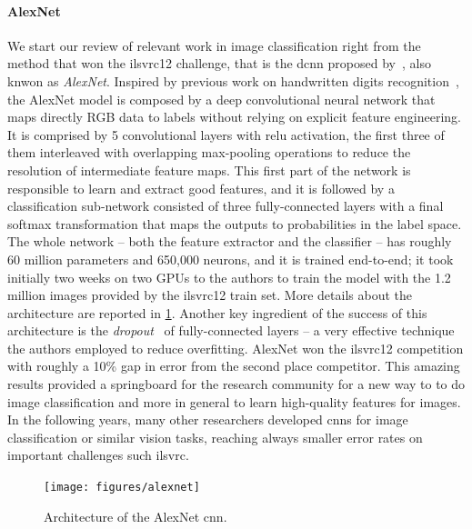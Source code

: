\paragraph{AlexNet}
We start our review of relevant work in image classification right from the method that won the \gls{ilsvrc}12 challenge, that is the \gls{dcnn} proposed by~\citet{krizhevsky2012imagenet}, also knwon as \emph{AlexNet}.
Inspired by previous work on handwritten digits recognition~\cite{lecun1989backpropagation}, the AlexNet model is composed by a deep convolutional neural network that maps directly RGB data to labels without relying on explicit feature engineering.
It is comprised by 5 convolutional layers with \gls{relu} activation, the first three of them interleaved with overlapping max-pooling operations to reduce the resolution of intermediate feature maps.
This first part of the network is responsible to learn and extract good features, and it is followed by a classification sub-network consisted of three fully-connected layers with a final softmax transformation that maps the outputs to probabilities in the label space.
The whole network -- both the feature extractor and the classifier -- has roughly 60 million parameters and 650,000 neurons, and it is trained end-to-end;
it took initially two weeks on two GPUs to the authors to train the model with the 1.2 million images provided by the \gls{ilsvrc}12 train set.
More details about the architecture are reported in \ref{fig:back:alexnet}.
Another key ingredient of the success of this architecture is the \emph{dropout}~\cite{} of fully-connected layers -- a very effective technique the authors employed to reduce overfitting.
AlexNet won the \gls{ilsvrc}12 competition with roughly a 10\% gap in error from the second place competitor.
This amazing results provided a springboard for the research community for a new way to to do image classification and more in general to learn high-quality features for images.
In the following years, many other researchers developed \glspl{cnn} for image classification or similar vision tasks, reaching always smaller error rates on important challenges such \gls{ilsvrc}.

\begin{figure}
    \centering
    \texttt{[image: figures/alexnet]}
    \caption{Architecture of the AlexNet \gls{cnn}.}
    \label{fig:back:alexnet}
\end{figure}

